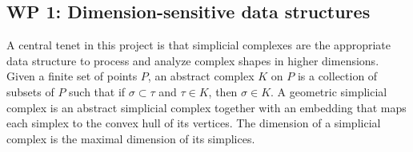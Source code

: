 \subsection*{WP 1:  Dimension-sensitive data structures} 

A central tenet in this project is that simplicial complexes are the appropriate data structure
to process and analyze complex shapes in higher dimensions. Given a finite set of points $P$, an abstract complex $K$ on $P$ is a collection of subsets of $P$ such that 
if $\sigma\subset \tau$ and $\tau\in K$, then $\sigma \in K$.
A geometric simplicial complex is an abstract simplicial complex together with an embedding that maps each simplex to the convex hull of its vertices. The dimension of a simplicial complex is the maximal dimension of its simplices. %
